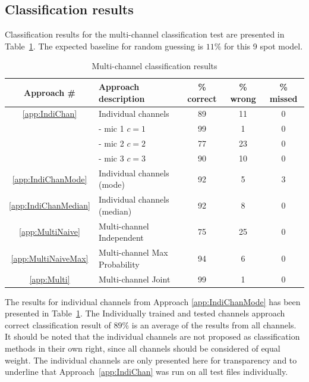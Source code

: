 \subsection{Classification results}\label{sec:MultiAPRResultsClass}
Classification results for the multi-channel classification test are presented in Table~\ref{tab:multiAPRresults}. The expected baseline for random guessing is $11 \%$ for this 9 spot model.
\begin{table}\begin{center}
\caption{Multi-channel classification results}
\label{tab:multiAPRresults}
\begin{tabular}{|c|l|c|c|c|}\hline
Approach \#             & Approach description          & \% correct    & \% wrong  & \% missed  \\ \hline
\ref{app:IndiChan}      & Individual channels           & 89            & 11        & 0          \\
                        &  - mic 1 $c = 1$              & 99            & 1         & 0          \\
                        &  - mic 2 $c = 2$              & 77            & 23        & 0          \\
                        &  - mic 3 $c = 3$              & 90            & 10        & 0          \\
\ref{app:IndiChanMode}  & Individual channels (mode)    & 92            & 5         & 3          \\
\ref{app:IndiChanMedian}& Individual channels (median)  & 92            & 8         & 0          \\
\ref{app:MultiNaive}    & Multi-channel Independent     & 75            & 25        & 0          \\
\ref{app:MultiNaiveMax} & Multi-channel Max Probability & 94            & 6         & 0          \\
\ref{app:Multi}         & Multi-channel Joint           & 99            & 1         & 0          \\ \hline
\end{tabular}\end{center}\end{table}

The results for individual channels from Approach \ref{app:IndiChanMode} has been presented in Table~\ref{tab:multiAPRresults}. The Individually trained and tested channels approach \DIFaddbegin {}\DIFaddend correct classification result of $89\%$ \DIFaddbegin {}\DIFaddend is an average of the results from all channels. It should be noted that the individual channels are not proposed as classification methods in their own right, since all channels should be considered of equal weight. The individual channels are only presented here for transparency and to underline that Approach~\ref{app:IndiChan} was run on all test files individually.

